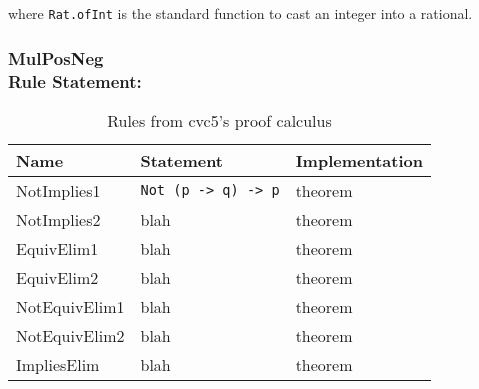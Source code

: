 where \texttt{Rat.ofInt} is the standard function to cast an integer into a rational.

\subsubsection*{MulPosNeg\\Rule Statement:}



\begin{table}[]\label{tab:rules}
\centering
\begin{tabular}{ l l l }
\toprule
Name        & Statement & Implementation \\ \midrule
NotImplies1 & \texttt{Not (p -> q) -> p}      & theorem        \\ \midrule
NotImplies2 & blah      & theorem        \\ \midrule
EquivElim1  & blah      & theorem        \\ \midrule
EquivElim2  & blah      & theorem        \\ \midrule
NotEquivElim1  & blah      & theorem        \\ \midrule
NotEquivElim2  & blah      & theorem        \\ \midrule
ImpliesElim & blah      & theorem        \\ \bottomrule
\end{tabular}
\caption{Rules from cvc5's proof calculus}
\end{table}





